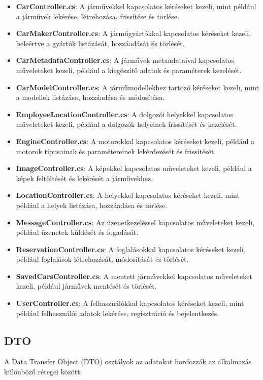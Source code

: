 \documentclass{report}[11pt]
\begin{document}
\begin{itemize}
    \item \textbf{CarController.cs}: A járművekkel kapcsolatos kéréseket kezeli, mint például a járművek lekérése, létrehozása, frissítése és törlése.
    \item \textbf{CarMakerController.cs}: A járműgyártókkal kapcsolatos kéréseket kezeli, beleértve a gyártók listázását, hozzáadását és törlését.
    \item \textbf{CarMetadataController.cs}: A járművek metaadataival kapcsolatos műveleteket kezeli, például a kiegészítő adatok és paraméterek kezelését.
    \item \textbf{CarModelController.cs}: A járműmodellekhez tartozó kéréseket kezeli, mint a modellek listázása, hozzáadása és módosítása.
    \item \textbf{EmployeeLocationController.cs}: A dolgozói helyekkel kapcsolatos műveleteket kezeli, például a dolgozók helyeinek frissítését és kezelését.
    \item \textbf{EngineController.cs}: A motorokkal kapcsolatos kéréseket kezeli, például a motorok típusainak és paramétereinek lekérdezését és frissítését.
    \item \textbf{ImageController.cs}: A képekkel kapcsolatos műveleteket kezeli, például a képek feltöltését és lekérését a járművekhez.
    \item \textbf{LocationController.cs}: A helyekkel kapcsolatos kéréseket kezeli, mint például a helyek listázása, hozzáadása és törlése.
    \item \textbf{MessageController.cs}: Az üzenetkezeléssel kapcsolatos műveleteket kezeli, például üzenetek küldését és fogadását.
    \item \textbf{ReservationController.cs}: A foglalásokkal kapcsolatos kéréseket kezeli, például foglalások létrehozását, módosítását és törlését.
    \item \textbf{SavedCarsController.cs}: A mentett járművekkel kapcsolatos műveleteket kezeli, például járművek mentését és törlését.
    \item \textbf{UserController.cs}: A felhasználókkal kapcsolatos kéréseket kezeli, mint például felhasználói adatok lekérése, regisztráció és bejelentkezés.
\end{itemize}


\subsection{DTO}
A Data Transfer Object (DTO) osztályok az adatokat hordozzák az alkalmazás különböző rétegei között:
\end{document}
